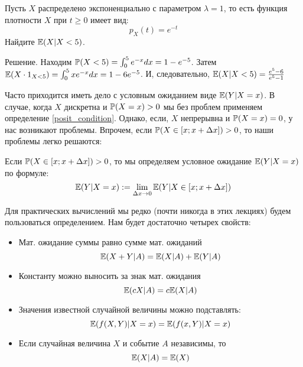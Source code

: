 \begin{myex} Пусть $ X $ распределено экспоненциально с параметром $ \lambda=1 $, то есть функция плотности $ X $ при $ t\geq 0 $ имеет вид:
\[ p_{X}(t)=e^{-t} \]
Найдите $ \E(X|X<5) $.

Решение. Находим $ \P(X<5)=\int_{0}^{5}e^{-x}dx=1-e^{-5} $. Затем $ \E(X\cdot 1_{X<5})=\int_{0}^{5} xe^{-x}dx=1-6e^{-5} $. И, следовательно, $ \E(X|X<5)=\frac{e^{5}-6}{e^{5}-1} $

\end{myex}


Часто приходится иметь дело с условным ожиданием виде $ \E(Y|X=x) $. В случае, когда $ X $ дискретна и $ \P(X=x)>0 $ мы без проблем применяем определение \ref{posit_condition}. Однако, если, $ X $ непрерывна и $ \P(X=x)=0 $, у нас возникают проблемы. Впрочем, если $ \P(X\in [x;x+\Delta x])>0$, то наши проблемы легко решаются:
\begin{mydef}
Если $ \P(X\in [x;x+\Delta x])>0 $, то мы определяем условное ожидание $ \E(Y|X=x) $ по формуле:
\begin{equation}
\E(Y|X=x):=\lim_{\Delta x\to 0}\E(Y|X\in [x;x+\Delta x])
\end{equation}
\end{mydef}

Для практических вычислений мы редко (почти никогда в этих лекциях) будем пользоваться определением. Нам будет достаточно четырех свойств:

\begin{itemize}
\item Мат. ожидание суммы равно сумме мат. ожиданий
\begin{equation}
\E(X+Y|A)=\E(X|A)+\E(Y|A)
\end{equation}
\item Константу можно выносить за знак мат. ожидания
\begin{equation}
\E(cX|A)=c\E(X|A)
\end{equation}
\item Значения известной случайной величины можно подставлять:
\begin{equation}
\E(f(X,Y)|X=x)=\E(f(x,Y)|X=x)
\end{equation}
\item Если случайная величина $ X $ и событие $ A $ независимы, то
\begin{equation}
\E(X|A)=\E(X)
\end{equation}

\end{itemize}

